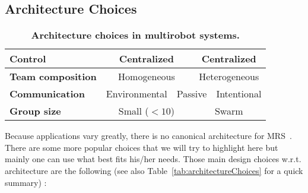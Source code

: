   \subsection{Architecture Choices}

    \begin{table*}[ht]
      \centerfloat
        \begin{tabular}{|l|c|c|c|c|c|c|}
          \hline
          \textbf{Control} & \multicolumn{3}{|c|}{Centralized} & \multicolumn{3}{|c|}{Centralized} \\
          \hline
          \textbf{Team composition} & \multicolumn{3}{|c|}{Homogeneous} & \multicolumn{3}{|c|}{Heterogeneous} \\
          \hline
          \textbf{Communication} & \multicolumn{2}{|c|}{Environmental} & \multicolumn{2}{|c|}{Passive} & \multicolumn{2}{|c|}{Intentional} \\
          \hline
          \textbf{Group size} & \multicolumn{3}{|c|}{Small (\(< 10\))} & \multicolumn{3}{|c|}{Swarm} \\
          \hline
        \end{tabular}
        \caption{\textbf{Architecture choices in multirobot systems.}}
      \label{table:architectureChoices}
    \end{table*}

    Because applications vary greatly, there is no canonical architecture for MRS~\parencite{Cao1997, Parker2008}. There are some more popular choices that we will try to highlight here but mainly one can use what best fits his/her needs. Those main design choices w.r.t. architecture are the following (see also Table~\ref{tab:architectureChoices} for a quick summary) :

